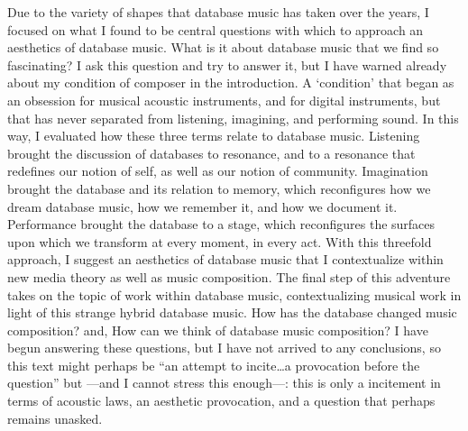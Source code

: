 Due to the variety of shapes that database music has taken over the years, I focused on what I found to be central questions with which to approach an aesthetics of database music. What is it about database music that we find so fascinating? I ask this question and try to answer it, but I have warned already about my condition of composer in the introduction. A `condition' that began as an obsession for musical acoustic instruments, and for digital instruments, but that has never separated from listening, imagining, and performing sound. In this way, I evaluated how these three terms relate to database music. Listening brought the discussion of databases to resonance, and to a resonance that redefines our notion of self, as well as our notion of community. Imagination brought the database and its relation to memory, which reconfigures how we dream database music, how we remember it, and how we document it. Performance brought the database to a stage, which reconfigures the surfaces upon which we transform at every moment, in every act. With this threefold approach, I suggest an aesthetics of database music that I contextualize within new media theory as well as music composition. The final step of this adventure takes on the topic of work within database music, contextualizing musical work in light of this strange hybrid database music. How has the database changed music composition? and, How can we think of database music composition? I have begun answering these questions, but I have not arrived to any conclusions, so this text might perhaps be ``an attempt to incite\dots a provocation before the question'' but ---and I cannot stress this enough---: this is only a incitement in terms of acoustic laws, an aesthetic provocation, and a question that perhaps remains unasked.
